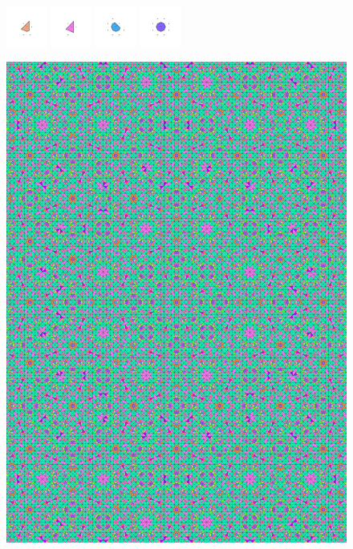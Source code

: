 \documentclass[text.tex]{subfiles}
\begin{document}
\begin{figure}[h!]
\includegraphics[width=0.12\textwidth]{img/results/octagon/octagon_235355_(7_1alpha_4)_014.pdf}
\includegraphics[width=0.12\textwidth]{img/results/octagon/octagon_235355_(7_1alpha_4)_015.pdf}
\includegraphics[width=0.12\textwidth]{img/results/octagon/octagon_235355_(7_1alpha_4)_016.pdf}
\includegraphics[width=0.12\textwidth]{img/results/octagon/octagon_235355_(7_1alpha_4)_017.pdf}
\end{figure}

\begin{figure}[h!]
\centering
\includegraphics[width=1\textwidth]{img/results/octagon/quasi_polygon-octagon_235355_(7_1alpha_4).pdf}
\end{figure}
\end{document}
